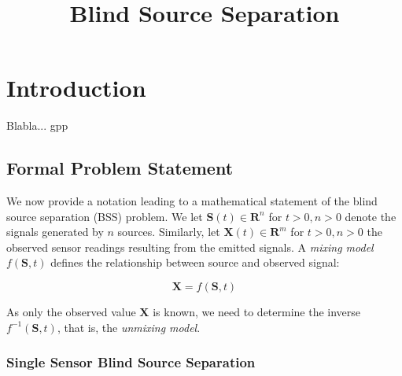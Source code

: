 \documentclass[11pt, oneside, a4paper]{report}
\begin{document}

\title{Blind Source Separation}
\author{}
\date{}    %
\maketitle

\begin{abstract}

\end{abstract}

\tableofcontents

\chapter{Introduction}

Blabla... gpp

\section{Formal Problem Statement}

We now provide a notation leading to a mathematical statement of the blind source separation (BSS) problem. We let $\boldsymbol{S}(t)\in \mathbf{R}^n$ for $t>0, n>0$ denote the signals generated by $n$ sources. Similarly, let $\boldsymbol{X}(t)\in \mathbf{R}^m$ for $t>0, n>0$ the observed sensor readings resulting from the emitted signals. A \emph{mixing model} $f(\boldsymbol{S},t)$ defines the relationship between source and observed signal:

\begin{equation}\label{mixing_model}
  \boldsymbol{X} = f(\boldsymbol{S},t)
\end{equation}

As only the observed value $\boldsymbol{X}$ is known, we need to determine the inverse $f^{-1}(\boldsymbol{S},t)$, that is, the \emph{unmixing model}.

\subsection*{Single Sensor Blind Source Separation}
\end{document}
